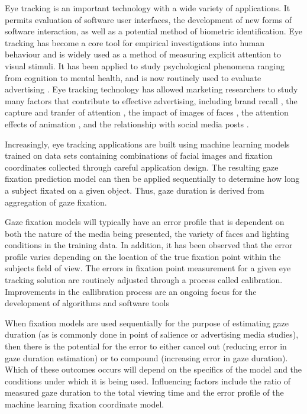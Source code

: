 \documentclass[12pt,a4paper]{article}
\numberwithin{equation}{section}
\begin{document}
Eye tracking is an important technology with a wide variety of applications. It permits evaluation
of software user interfaces\cite{Harezlak2015}, the development of new forms of software interaction, as well as a potential method of biometric identification\cite{Kasprowski2018}. 
Eye tracking has become a core tool for empirical investigations 
into human behaviour and is widely used as a method of measuring explicit attention to visual stimuli. 
It has been applied to study psychological phenomena ranging from cognition\cite{Brunye2019}
to mental health\cite{Duque2014,Rudich-Strassler2022}, and is now routinely used to evaluate 
advertising \cite{Hervet2011}. Eye tracking technology has allowed marketing researchers 
to study many factors that contribute to effective advertising, 
including brand recall \cite{Wedel2000},
the capture and tranfer of attention \cite{Pieters2004}, 
the impact of images of faces \cite{Djamasbi2010},
the attention effects of animation \cite{Hamborg2012},
and the relationship with social media posts \cite{Barreto2013}.

Increasingly, eye tracking applications are built using machine learning models trained on 
data sets containing combinations of facial images and fixation coordinates collected 
through careful application design. The resulting gaze fixation prediction model can 
then be applied sequentially to determine how long a subject fixated on a given object.
Thus, gaze duration is derived from aggregation of gaze fixation.

Gaze fixation models will typically have an error profile that is dependent on both 
the nature of the media being presented, the variety of faces and lighting conditions 
in the training data. In addition, it has been observed that the error profile varies 
depending on the location of the true fixation point within the subjects field of view.
The errors in fixation point measurement for a given eye tracking solution are routinely
adjusted through a process called calibration. Improvements in the callibration process
are an ongoing focus for the development of algorithms\cite{Zhang2014,Hassoumi2019} 
and software tools\cite{ETCAL2018} 

When fixation models are used sequentially for the purpose of estimating gaze duration
(as is commonly done in point of salience or advertising media studies), 
then there is the potential for the error
to either cancel out (reducing error in gaze duration estimation) or to compound
(increasing error in gaze duration). Which of these outcomes occurs will depend on the
specifics of the model and the conditions under which it is being used.
Influencing factors include the ratio of measured gaze duration to the total viewing time
and the error profile of the machine learning fixation coordinate model.
\end{document}
